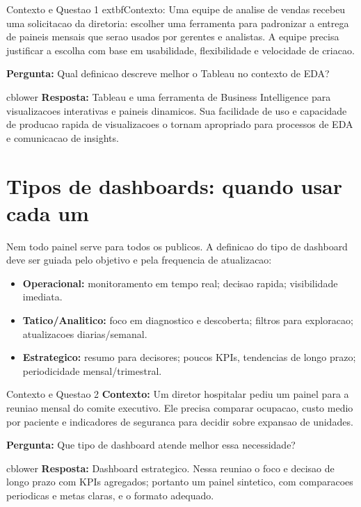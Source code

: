 \begin{SolvedBox}{Contexto e Questao 1}
	extbf{Contexto:} Uma equipe de analise de vendas recebeu uma solicitacao da diretoria: escolher uma ferramenta para padronizar a entrega de paineis mensais que serao usados por gerentes e analistas. A equipe precisa justificar a escolha com base em usabilidade, flexibilidade e velocidade de criacao.

	\textbf{Pergunta:} Qual definicao descreve melhor o Tableau no contexto de EDA?

	cblower
	\textbf{Resposta:} Tableau e uma ferramenta de Business Intelligence para visualizacoes interativas e paineis dinamicos. Sua facilidade de uso e capacidade de producao rapida de visualizacoes o tornam apropriado para processos de EDA e comunicacao de insights.
\end{SolvedBox}

\section{Tipos de dashboards: quando usar cada um}

Nem todo painel serve para todos os publicos. A definicao do tipo de dashboard deve ser guiada pelo objetivo e pela frequencia de atualizacao:
\begin{itemize}
  \item \textbf{Operacional:} monitoramento em tempo real; decisao rapida; visibilidade imediata.
  \item \textbf{Tatico/Analitico:} foco em diagnostico e descoberta; filtros para exploracao; atualizacoes diarias/semanal.
  \item \textbf{Estrategico:} resumo para decisores; poucos KPIs, tendencias de longo prazo; periodicidade mensal/trimestral.
\end{itemize}

\begin{SolvedBox}{Contexto e Questao 2}
	\textbf{Contexto:} Um diretor hospitalar pediu um painel para a reuniao mensal do comite executivo. Ele precisa comparar ocupacao, custo medio por paciente e indicadores de seguranca para decidir sobre expansao de unidades.

	\textbf{Pergunta:} Que tipo de dashboard atende melhor essa necessidade?

	cblower
	\textbf{Resposta:} Dashboard estrategico. Nessa reuniao o foco e decisao de longo prazo com KPIs agregados; portanto um painel sintetico, com comparacoes periodicas e metas claras, e o formato adequado.
\end{SolvedBox}

